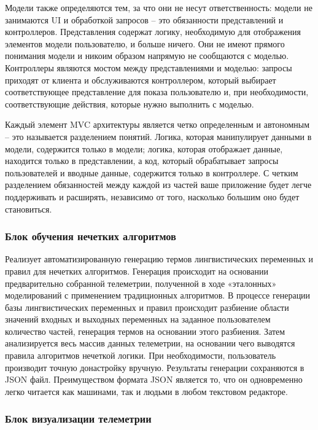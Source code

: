 Модели также определяются тем, за что они не несут ответственность: модели не занимаются UI и обработкой запросов – это обязанности представлений и контроллеров. Представления содержат логику, необходимую для отображения элементов модели пользователю, и больше ничего. Они не имеют прямого понимания модели и никоим образом напрямую не сообщаются с моделью. Контроллеры являются мостом между представлениями и моделью: запросы приходят от клиента и обслуживаются контроллером, который выбирает соответствующее представление для показа пользователю и, при необходимости, соответствующие действия, которые нужно выполнить с моделью.

Каждый элемент MVC архитектуры является четко определенным и автономным – это называется разделением понятий. Логика, которая манипулирует данными в модели, содержится только в модели; логика, которая отображает данные, находится только в представлении, а код, который обрабатывает запросы пользователей и вводные данные, содержится только в контроллере. С четким разделением обязанностей между каждой из частей ваше приложение будет легче поддерживать и расширять, независимо от того, насколько большим оно будет становиться.




\subsubsection{Блок обучения нечетких алгоритмов}
 
 Реализует автоматизированную генерацию термов лингвистических переменных и правил для нечетких алгоритмов. Генерация происходит на основании предварительно собранной телеметрии, полученной в ходе «эталонных» моделирований с применением традиционных алгоритмов. В процессе генерации базы лингвистических переменных и правил происходит разбиение области значений входных и выходных переменных на заданное пользователем количество частей, генерация термов на основании этого разбиения. Затем анализируется весь массив данных телеметрии, на основании чего выводятся правила алгоритмов нечеткой логики. При необходимости, пользователь производит точную донастройку вручную. Результаты генерации сохраняются в JSON файл. Преимуществом формата JSON является то, что он одновременно легко читается как машинами, так и людьми в любом текстовом редакторе.

\subsubsection{Блок визуализации телеметрии} 

